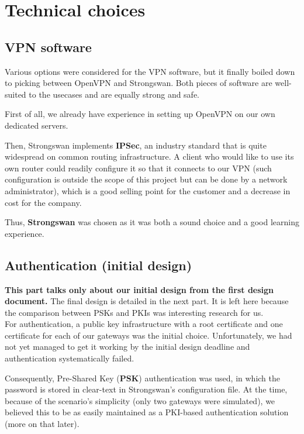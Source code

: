 \documentclass[paper=a4, fontsize=11pt]{scrartcl}
\begin{document}
\section{Technical choices}

\subsection{VPN software}

Various options were considered for the VPN software, but it finally boiled down
to picking between OpenVPN and Strongswan.
Both pieces of software are well-suited to the usecases and are equally
strong and safe.

First of all, we already have experience in setting up OpenVPN on our own
dedicated servers.

Then, Strongswan implements \textbf{IPSec}, an industry standard that is quite
widespread on common routing infrastructure.
A client who would like to use its own router could readily configure
it so that it connects to our VPN (such configuration is outside the scope of
this project but can be done by a network administrator), which is a good
selling point for the customer and a decrease in cost for the company.

Thus, \textbf{Strongswan} was chosen as it was both a sound choice and a good learning
experience.

\subsection{Authentication (initial design)}
\textbf{%
\huge \danger{} \normalsize
This part talks only about our initial design from the first design document.}
The final design is detailed in the next part.
It is left here because the comparison between PSKs and PKIs was interesting
research for us.
\\

For authentication, a public key infrastructure with a root certificate and one
certificate for each of our gateways was the initial choice.
Unfortunately, we had not yet managed to get it working by the initial design
deadline and authentication systematically failed.

Consequently, Pre-Shared Key (\textbf{PSK}) authentication was used, in which the
password is stored in clear-text in Strongswan's configuration file.
At the time, because of the scenario's simplicity (only two gateways were
simulated), we believed this to be as easily maintained as a
PKI-based authentication solution (more on that later).\\
\end{document}
